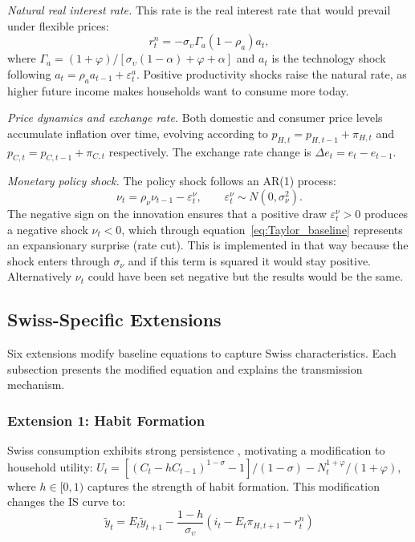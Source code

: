 \documentclass[12pt,a4paper]{article}
\begin{document}
\textit{Natural real interest rate.} This rate is the real interest rate that would prevail under flexible prices:
\begin{equation}
	r_t^n = -\sigma_\upsilon\Gamma_a(1-\rho_a)a_t,
	\label{eq:rnat}
\end{equation}
where $\Gamma_a = (1+\varphi)/[\sigma_\upsilon(1-\alpha)+\varphi+\alpha]$ and $a_t$ is the technology shock following $a_t = \rho_a a_{t-1} + \varepsilon_t^a$. Positive productivity shocks raise the natural rate, as higher future income makes households want to consume more today.

\textit{Price dynamics and exchange rate.} Both domestic and consumer price levels accumulate inflation over time, evolving according to $p_{H,t} = p_{H,t-1} + \pi_{H,t}$ and $p_{C,t} = p_{C,t-1} + \pi_{C,t}$ respectively. The exchange rate change is $\Delta e_t = e_t - e_{t-1}$.

\textit{Monetary policy shock.} The policy shock follows an AR(1) process:
\begin{equation}
	\nu_t = \rho_\nu\nu_{t-1} - \varepsilon_t^\nu, \qquad \varepsilon_t^\nu \sim N(0,\sigma_\nu^2).
	\label{eq:shock}
\end{equation}
The negative sign on the innovation ensures that a positive draw $\varepsilon_t^\nu > 0$ produces a negative shock $\nu_t < 0$, which through equation~\eqref{eq:Taylor_baseline} represents an expansionary surprise (rate cut). This is implemented in that way because the shock enters through $\sigma_\nu$ and if this term is squared it would stay positive. Alternatively $\nu_t$ could have been set negative but the results would be the same.
\subsection{Swiss-Specific Extensions}
\label{subsec:swiss_extensions}

Six extensions modify baseline equations to capture Swiss characteristics. Each subsection presents the modified equation and explains the transmission mechanism.

\subsubsection{Extension 1: Habit Formation}

Swiss consumption exhibits strong persistence \citep{rudolf2014}, motivating a 
modification to household utility: $U_t = [(C_t - hC_{t-1})^{1-\sigma} - 1]/(1-\sigma) - N_t^{1+\varphi}/(1+\varphi)$, where $h \in [0,1)$ captures the strength of habit formation. This modification changes the IS curve to:
\begin{equation}
	\boxed{\tilde{y}_t = E_t\tilde{y}_{t+1} - \frac{1-h}{\sigma_\upsilon}(i_t - E_t\pi_{H,t+1} - r_t^n)}
	\label{eq:IS_habit}
\end{equation}
\end{document}
